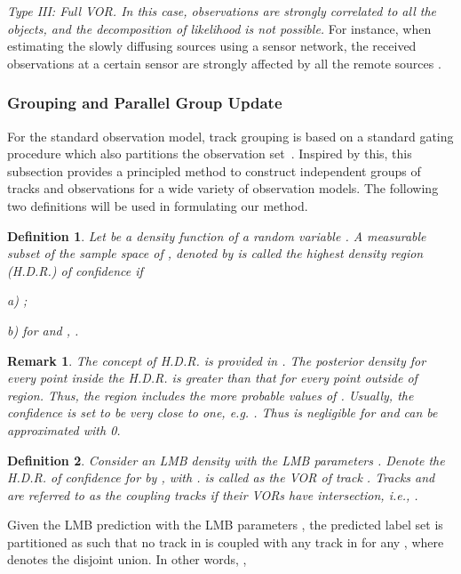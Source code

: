 \documentclass[journal]{IEEEtran}
\newtheorem{Def}{Definition}
\newtheorem{Rem}{Remark}
\begin{document}
{  \textit{Type III: Full VOR.  In this case, observations are strongly correlated to all the objects, and the decomposition of likelihood  is  not possible.}
For instance, when estimating the slowly diffusing sources using a sensor network, the received observations  at a certain sensor are strongly affected by  all the remote sources \cite{diffusion_source}. 

\subsubsection{Grouping and Parallel Group Update}
For  the standard observation model, track grouping is based on a standard gating procedure which also partitions the observation set~\cite{refr:JPDA,refr:label_5}.  
Inspired by this, this subsection provides  a principled method to construct independent groups of tracks and observations for a wide variety of observation models. 
The following two definitions  will be used in formulating our method. 

\begin{Def}\label{definition:3}
Let  be a density function of a random variable . A measurable subset of  the sample space  of , denoted by  is called the highest  density  region (H.D.R.) of confidence  if
 
a) ;
 
b) for  and , .
\end{Def}

\begin{Rem}\label{remark:6} The concept of H.D.R. is provided in \cite{refr:HPD,refr:HDR}. The posterior density for every point inside the H.D.R.  is greater than that for every point outside of region. Thus, the region includes the more probable values of . Usually, the confidence  is set to be very close to one, e.g. . Thus  is negligible for  and can be approximated with 0.
\end{Rem}

\begin{Def}\label{definition:4}
Consider an LMB density with the LMB parameters .  Denote the H.D.R. of
confidence  for   by , with .    is called as the VOR of track 
. Tracks  and  are referred to as the coupling tracks   if their  VORs  have intersection, i.e., .
\end{Def}



 Given the LMB prediction with the LMB parameters ,  the predicted label set is partitioned as  such that no track in  is coupled with any track in  for any , where  denotes the disjoint union.  In other words, ,

}
\end{document}
